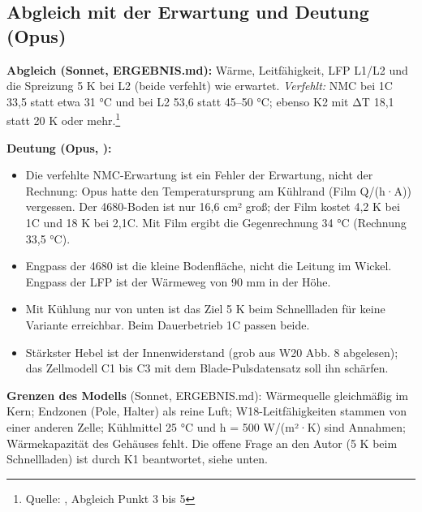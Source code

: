 \documentclass[10pt,a4paper]{article}
\newcommand{\quelle}[1]{\footnote{\raggedright Quelle: #1}}
\begin{document}
\subsection*{Abgleich mit der Erwartung und Deutung (Opus)}
\textbf{Abgleich (Sonnet, ERGEBNIS.md):} Wärme, Leitfähigkeit, LFP L1/L2 und die Spreizung 5 K bei L2 (beide verfehlt) wie erwartet. \emph{Verfehlt:} NMC bei 1C 33,5 statt etwa 31 °C und bei L2 53,6 statt 45--50 °C; ebenso K2 mit ΔT 18,1 statt 20 K oder mehr.\quelle{, Abgleich Punkt 3 bis 5}

\textbf{Deutung (Opus, ):}
\begin{itemize}[nosep]
\item Die verfehlte NMC-Erwartung ist ein Fehler der Erwartung, nicht der Rechnung: Opus hatte den Temperatursprung am Kühlrand (Film Q/(h·A)) vergessen. Der 4680-Boden ist nur 16,6 cm² groß; der Film kostet 4,2 K bei 1C und 18 K bei 2,1C. Mit Film ergibt die Gegenrechnung 34 °C (Rechnung 33,5 °C).
\item Engpass der 4680 ist die kleine Bodenfläche, nicht die Leitung im Wickel. Engpass der LFP ist der Wärmeweg von 90 mm in der Höhe.
\item Mit Kühlung nur von unten ist das Ziel 5 K beim Schnellladen für keine Variante erreichbar. Beim Dauerbetrieb 1C passen beide.
\item Stärkster Hebel ist der Innenwiderstand (grob aus W20 Abb. 8 abgelesen); das Zellmodell C1 bis C3 mit dem Blade-Pulsdatensatz soll ihn schärfen.
\end{itemize}
\textbf{Grenzen des Modells} (Sonnet, ERGEBNIS.md): Wärmequelle gleichmäßig im Kern; Endzonen (Pole, Halter) als reine Luft; W18-Leitfähigkeiten stammen von einer anderen Zelle; Kühlmittel 25 °C und h = 500 W/(m²·K) sind Annahmen; Wärmekapazität des Gehäuses fehlt.
Die offene Frage an den Autor (5 K beim Schnellladen) ist durch K1 beantwortet, siehe unten.
\end{document}
